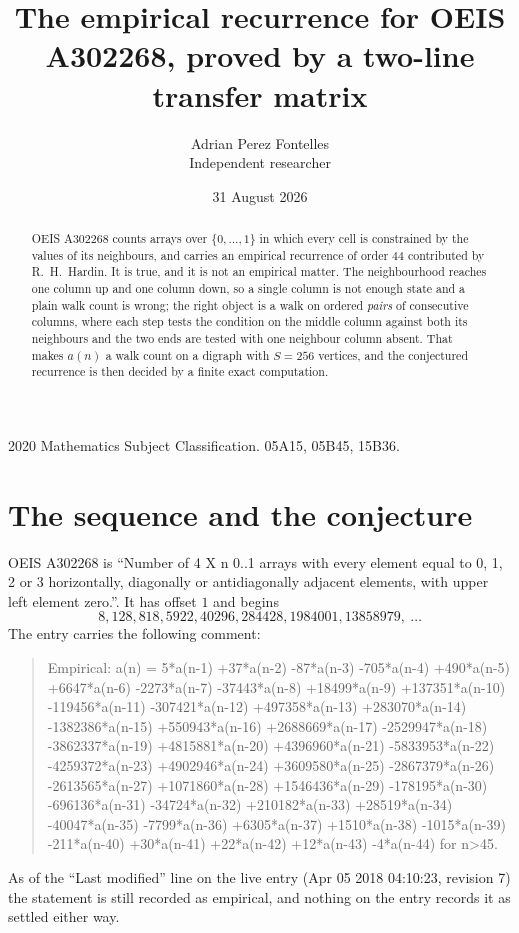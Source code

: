 \documentclass[11pt,a4paper]{article}
\title{The empirical recurrence for OEIS A302268, proved by a two-line transfer matrix}
\author{Adrian Perez Fontelles\\ \small Independent researcher}
\date{31 August 2026}
\theoremstyle{plain}
\theoremstyle{definition}
\begin{document}
\maketitle

\begin{abstract}
OEIS A302268 counts arrays over $\{0,\dots,1\}$ in which every cell is constrained by the
values of its neighbours, and carries an empirical recurrence of order $44$ contributed
by R.~H.~Hardin. It is true, and it is not an empirical matter. The neighbourhood reaches one
column up and one column down, so a single column is not enough state and a plain walk count
is wrong; the right object is a walk on ordered \emph{pairs} of consecutive columns, where
each step tests the condition on the middle column against both its neighbours and the two
ends are tested with one neighbour column absent. That makes $a(n)$ a walk count on a digraph
with $S=256$ vertices, and the conjectured recurrence is then decided by a finite exact
computation.
\end{abstract}

\noindent\small 2020 Mathematics Subject Classification. 05A15, 05B45, 15B36.\normalsize

\section{The sequence and the conjecture}

OEIS A302268 is ``Number of 4 X n 0..1 arrays with every element equal to 0, 1, 2 or 3 horizontally, diagonally or antidiagonally adjacent elements, with upper left element zero.''. It has offset $1$ and begins
\[
8, 128, 818, 5922, 40296, 284428, 1984001, 13858979,\ \dots
\]
The entry carries the following comment:
\begin{quote}\small
Empirical: a(n) = 5*a(n-1) +37*a(n-2) -87*a(n-3) -705*a(n-4) +490*a(n-5) +6647*a(n-6) -2273*a(n-7) -37443*a(n-8) +18499*a(n-9) +137351*a(n-10) -119456*a(n-11) -307421*a(n-12) +497358*a(n-13) +283070*a(n-14) -1382386*a(n-15) +550943*a(n-16) +2688669*a(n-17) -2529947*a(n-18) -3862337*a(n-19) +4815881*a(n-20) +4396960*a(n-21) -5833953*a(n-22) -4259372*a(n-23) +4902946*a(n-24) +3609580*a(n-25) -2867379*a(n-26) -2613565*a(n-27) +1071860*a(n-28) +1546436*a(n-29) -178195*a(n-30) -696136*a(n-31) -34724*a(n-32) +210182*a(n-33) +28519*a(n-34) -40047*a(n-35) -7799*a(n-36) +6305*a(n-37) +1510*a(n-38) -1015*a(n-39) -211*a(n-40) +30*a(n-41) +22*a(n-42) +12*a(n-43) -4*a(n-44) for n>45.
\end{quote}
As of the ``Last modified'' line on the live entry (Apr 05 2018 04:10:23, revision 7) the statement is
still recorded as empirical, and nothing on the entry records it as settled either way.
\end{document}
